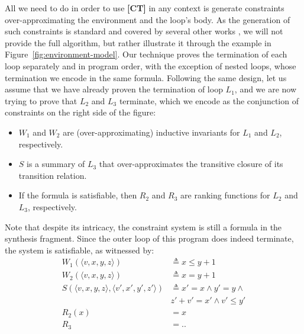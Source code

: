 \documentclass[preprint]{sigplanconf}
\theoremstyle{definition}
\begin{document}
All we need to do in order to use {\bf [CT]} in any context %
is generate constraints over-approximating %
the environment and the loop's body. %
As the generation of such constraints is standard and covered by several other works \cite{DBLP:conf/pldi/GrebenshchikovLPR12,DBLP:conf/pldi/GulwaniSV08}, 
we will not provide the full algorithm, but rather illustrate it through the example in Figure~\ref{fig:environment-model}.
Our technique proves the termination of each loop separately and in program order, 
with the exception of nested loops, whose termination we encode in the same formula.
Following the same design, let us assume that we have already proven the termination of loop $L_1$, and we are now trying to prove that $L_2$ and $L_3$ terminate, which we encode
as the conjunction of constraints on the right side of the figure:
\begin{itemize}
\item $W_1$ and $W_2$ are (over-approximating) inductive invariants for $L_1$ and $L_2$, respectively.
\item $S$ is a summary of $L_3$ that over-approximates the transitive closure of its transition relation.
\item If the formula is satisfiable, then $R_2$ and $R_3$ are ranking functions for $L_2$ and $L_3$, respectively.
\end{itemize}


Note that despite its intricacy, the constraint system is still a formula in the synthesis fragment.
Since the outer loop of this program does indeed terminate, the system is satisfiable, as witnessed by:
\begin{align*}
W_1(\langle v, x, y, z \rangle ) & \triangleq x \leq y + 1 \\
W_2(\langle v, x, y, z \rangle ) & \triangleq x = y + 1 \\
S(\langle v, x, y, z \rangle, \langle v', x', y', z' \rangle) & \triangleq x ' = x \wedge y' = y \wedge \\
& z' + v' = x' \wedge v' \leq y' \\
R_2(x) & = x\\
R_3 & = ..
\end{align*}
\end{document}
